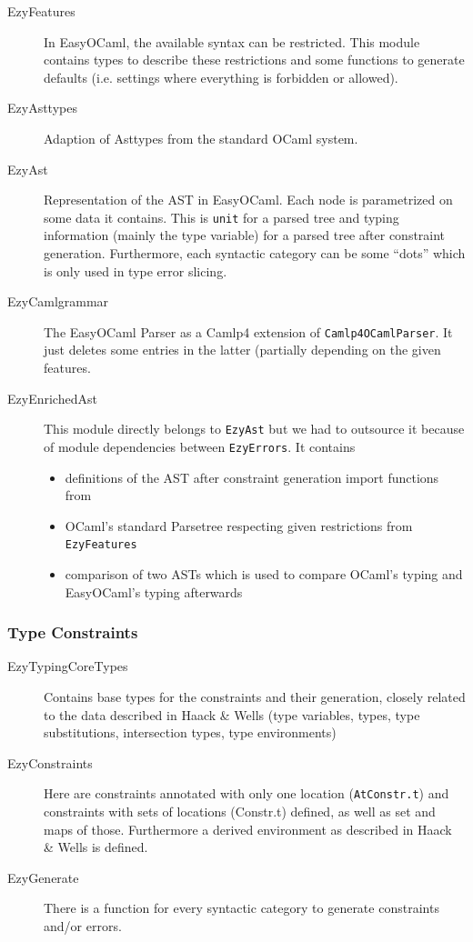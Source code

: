 \begin{description}
    \item[EzyFeatures] In EasyOCaml, the available syntax can be 
        restricted.  This module contains types to describe these 
        restrictions and some functions to generate defaults (i.e. 
        settings where everything is forbidden or allowed).
    \item[EzyAsttypes] Adaption of Asttypes from the standard OCaml 
        system.
    \item[EzyAst] Representation of the AST in EasyOCaml.  Each node 
        is parametrized on some data it contains.  This is \texttt{unit} 
        for a parsed tree and typing information (mainly the type 
        variable) for a parsed tree after constraint generation. 
        Furthermore, each syntactic category can be some ``dots'' which 
        is only used in type error slicing.
    \item[EzyCamlgrammar] The EasyOCaml Parser as a Camlp4 extension 
        of \texttt{Camlp4OCamlParser}.  It just deletes some entries in 
        the latter (partially depending on the given features.
    \item[EzyEnrichedAst] This module directly belongs to 
        \texttt{EzyAst} but we had to outsource it because of module 
        dependencies between \texttt{EzyErrors}.  It contains
        \begin{itemize}
            \item definitions of the AST after constraint generation 
                import functions from
            \item OCaml's standard Parsetree respecting given 
                restrictions from \texttt{EzyFeatures}
            \item comparison of two ASTs which is used to compare 
                OCaml's typing and EasyOCaml's typing afterwards
        \end{itemize}
\end{description}


\subsubsection{Type Constraints}

\begin{description}
    \item[EzyTypingCoreTypes] Contains base types for the 
        constraints and their generation, closely related to the data 
        described in Haack \& Wells (type variables, types, type 
        substitutions, intersection types, type environments)
    \item[EzyConstraints] Here are constraints annotated with only 
        one location (\texttt{AtConstr.t}) and constraints with sets of 
        locations (Constr.t) defined, as well as set and maps of those.  
        Furthermore a derived environment as described in Haack \& Wells 
        is defined.
    \item[EzyGenerate] There is a function for every syntactic 
        category to generate constraints and/or errors.
\end{description}

